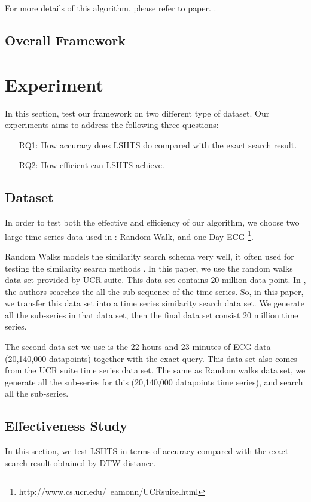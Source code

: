 \documentclass{article}
\begin{document}
For more details of this algorithm, please refer to paper. \cite{ioffe2010improved}. 

\subsection{Overall Framework}

\section{Experiment}
In this section, test our framework on two different type of dataset. Our experiments aims to address the following three questions:
\begin{enumerate}
  \item [RQ1:] How accuracy does LSHTS do compared with the exact search result. 
  \item [RQ2:] How efficient can LSHTS achieve.
\end{enumerate}

\subsection{Dataset}

In order to test both the effective and efficiency of our algorithm, we choose two large time series data used in \cite{rakthanmanon2012searching}: Random Walk, and one Day ECG \footnote{http://www.cs.ucr.edu/~eamonn/UCRsuite.html}.

Random Walks models the similarity search schema very well, it often used for testing the similarity search methods \cite{rakthanmanon2012searching}. 
In this paper, we use the random walks data set provided by UCR suite. This data set contains $20$ million data point. In \cite{rakthanmanon2012searching}, the authors searches the all the sub-sequence of the time series. So, in this paper, we transfer this data set into a time series similarity search data set. We generate all the sub-series in that data set, then the final data set consist $20$ million time series.

The second data set we use is the 22 hours and 23 minutes of ECG data (20,140,000 datapoints) together with the exact query. This data set also comes from the UCR suite time series data set. The same as Random walks data set, we generate all the sub-series for this (20,140,000 datapoints time series), and search all the sub-series.

\subsection{Effectiveness Study}
In this section, we test LSHTS in terms of accuracy compared with the exact search result obtained by DTW distance.
\end{document}
